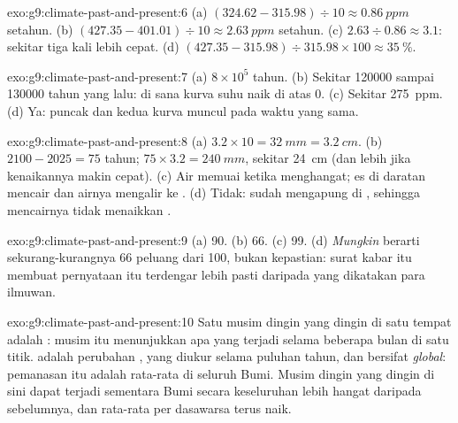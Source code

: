 \begin{solution}{exo:g9:climate-past-and-present:6}
(a) $(324.62 - 315.98) \div 10 \approx \qty{0.86}{ppm}$ setahun. (b)
$(427.35 - 401.01) \div 10 \approx \qty{2.63}{ppm}$ setahun. (c) $2.63
\div 0.86 \approx 3.1$: sekitar tiga kali lebih cepat. (d) $(427.35 - 315.98)
\div 315.98 \times 100 \approx 35~\%$.
\end{solution}

\begin{solution}{exo:g9:climate-past-and-present:7}
(a) $8 \times 10^5$ tahun. (b) Sekitar \num{120000} sampai \num{130000}
tahun yang lalu: di sana kurva suhu naik di atas 0. (c) Sekitar
\qty{275}{ppm}. (d) Ya: puncak dan  kedua kurva muncul pada waktu
yang sama.
\end{solution}

\begin{solution}{exo:g9:climate-past-and-present:8}
(a) $3.2 \times 10 = \qty{32}{mm} = \qty{3.2}{cm}$. (b) $2100 - 2025 =
75$ tahun; $75 \times 3.2 = \qty{240}{mm}$, sekitar \qty{24}{cm} (dan
lebih jika kenaikannya makin cepat). (c) Air  memuai ketika
menghangat; es di daratan mencair dan airnya mengalir ke . (d) Tidak:
 sudah mengapung di , sehingga mencairnya tidak menaikkan
.
\end{solution}

\begin{solution}{exo:g9:climate-past-and-present:9}
(a) 90. (b) 66. (c) 99. (d) \emph{Mungkin} berarti sekurang-kurangnya 66
peluang dari 100, bukan kepastian: surat kabar itu membuat pernyataan itu
terdengar lebih pasti daripada yang dikatakan para ilmuwan.
\end{solution}

\begin{solution}{exo:g9:climate-past-and-present:10}
Satu musim dingin yang dingin di satu tempat adalah \emph{}: musim
itu menunjukkan apa yang terjadi selama beberapa bulan di satu titik.
 adalah perubahan \emph{}, yang diukur selama
puluhan tahun, dan bersifat \emph{global}: pemanasan itu adalah rata-rata
di seluruh Bumi. Musim dingin yang dingin di sini dapat terjadi sementara
Bumi secara keseluruhan lebih hangat daripada sebelumnya, dan rata-rata
per dasawarsa terus naik.
\end{solution}


